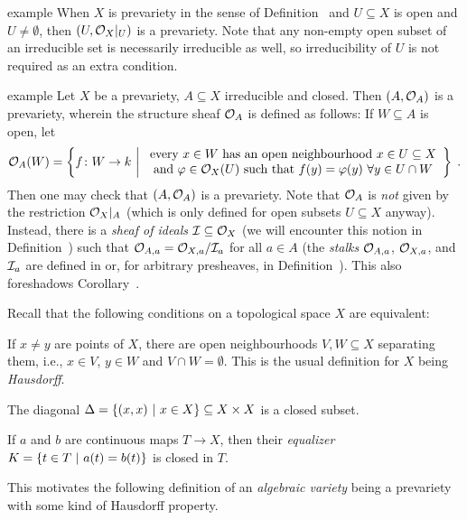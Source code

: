 \documentclass[a4paper,parskip=half,numbers=enddot, DIV=12]{scrreprt}
\begin{document}
\begin{varthm}{example}
 When $X$ is prevariety in the sense of Definition~ and $U\subseteq X$ is open and $U\neq \emptyset$, then $(U,\mathcal{O}_X|_U)$ is a prevariety. Note that any non-empty open subset of an irreducible set is necessarily irreducible as well, so irreducibility of $U$ is not required as an extra condition.
\end{varthm}
\begin{varthm}[b]{example}
 Let $X$ be a prevariety, $A\subseteq X$ irreducible and closed. Then $(A,\mathcal{O}_A)$ is a prevariety, wherein the structure sheaf $\mathcal{O}_A$ is defined as follows: If $W\subseteq A$ is open, let
 \begin{align*}
    \Oo_A(W) = \left\{ f\colon W\to k \st 
    \begin{array}{c}
	    \text{every } x\in W\text{ has an open neighbourhood } x\in U\subseteq X  \\
	    \text{and } \phi\in \Oo_X(U)\text{ such that } f(y) = \phi(y)\ \forall y\in U\cap W
    \end{array}\right\}\;.
 \end{align*}
 Then one may check that $(A,\mathcal{O}_A)$ is a prevariety. Note that $\mathcal{O}_A$ is \emph{not} given by the restriction $\mathcal{O}_X|_A$ (which is only defined for open subsets $U\subseteq X$ anyway). Instead, there is a \emph{sheaf of ideals} $\mathcal{I}\subseteq \mathcal{O}_X$ (we will encounter this notion in Definition~) such that $\mathcal{O}_{A,a}=\mathcal{O}_{X,a}/\mathcal{I}_a$ for all $a\in A$ (the \emph{stalks} $\mathcal{O}_{A,a}$, $\mathcal{O}_{X,a}$, and $\mathcal{I}_a$ are defined in \cite[Definition 2.2.5]{alg1} or, for arbitrary presheaves, in Definition~). This also foreshadows Corollary~.
\end{varthm}

\begin{rem*}
 Recall that the following conditions on a topological space $X$ are equivalent:
 \begin{alphanumerate}
  \item
    If $x\neq y$ are points of $X$, there are open neighbourhoods $V,W\subseteq X$ separating them, i.e., $x\in V$, $y\in W$ and $V\cap W= \emptyset$. This is the usual definition for $X$ being \emph{Hausdorff}.
  \item
    The diagonal $\Delta = \left\{(x,x)\ \middle|\  x\in X\right\}\subseteq X\times X$ is a closed subset.
  \item 
    If $a$ and $b$ are continuous maps $T\to X$, then their \emph{equalizer} $K = \left\{t\in T\ \middle|\  a(t) = b(t)\right\}$ is closed in $T$.
 \end{alphanumerate}
This motivates the following definition of an \emph{algebraic variety} being a prevariety with some kind of Hausdorff property.
\end{rem*}
\end{document}
